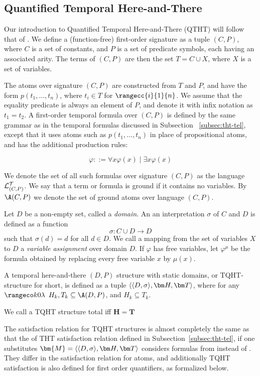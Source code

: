 \subsection{Quantified Temporal Here-and-There}

Our introduction to Quantified Temporal Here-and-There (QTHT) will
follow that of \cite{agcapevidi17a}. We define a (function-free)
first-order signature as a tuple $(C,P)$, where $C$ is a set of
constants, and $P$ is a set of predicate symbols, each having an
associated arity. The terms of $(C,P)$ are then the set
$T = C \cup X$, where $X$ is a set of variables.

The atoms over signature $(C,P)$ are constructed from $T$ and $P$, and
have the form $p(t_1,\dots,t_n)$, where $t_i \in T$ for
$\rangecc{i}{1}{n}$. We assume that the equality predicate is always
an element of $P$, and denote it with infix notation as $t_1=t_2$.
A first-order temporal formula over $(C,P)$ is defined by the same
grammar as in the temporal formulas discussed in Subsection
~\ref{subsec:tht-tel}, except that it uses atoms such as
$p(t_1, \dots, t_n)$ in place of propositional atoms, and has the
additional production rules:

$$
\varphi ::= \forall x \varphi(x) \mid \exists x \varphi(x)
$$

We denote the set of all such formulas over signature $(C,P)$ as the
language $\mathcal{L}_{(C,P)}^\mathcal{T}$. We say that a term or formula is ground if it
contains no variables. By $\A(C,P)$ we denote the set of ground atoms
over language $(C,P)$.

Let $D$ be a non-empty set, called a \emph{domain}. An an
interpretation $\sigma$ of $C$ and $D$ is defined as a function
$$
\sigma: C \cup D \rightarrow D
$$
such that $\sigma(d) = d$ for all $d \in D$. We call a mapping from
the set of variables $X$ to $D$ a \textit{variable assignment} over
domain $D$. If $\varphi$ has free variables, let $\varphi^\mu$ be the
formula obtained by replacing every free variable $x$ by $\mu(x)$.

\begin{definition}
  A temporal here-and-there $(D,P)$ structure with static domains, or
  TQHT-structure for short, is defined as a tuple $\qthandt$, where
  for any $\kinlambda$ $H_k,T_k \subseteq \A(D,P)$, and
  $H_k \subseteq T_k$.

  We call a TQHT structure total iff $\bm{H}=\bm{T}$
\end{definition}


The satisfaction relation for TQHT structures is almost completely the
same as that the of THT satisfaction relation defined in Subsection~\ref{subsec:tht-tel}, if
one substitutes $\bm{M}=\qthandt$ considers formulas from \langcdpt
instead of \langat. They differ in the satisfaction relation for
atoms, and additionally TQHT satisfaction is also defined for first
order quantifiers, as formalized below.

